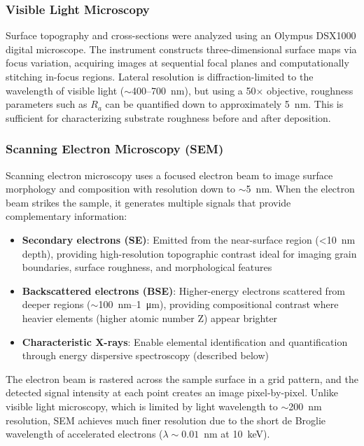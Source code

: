   \subsubsection{Visible Light Microscopy}
    
    Surface topography and cross-sections were analyzed using an Olympus DSX1000 digital microscope. The instrument constructs three-dimensional surface maps via focus variation, acquiring images at sequential focal planes and computationally stitching in-focus regions. Lateral resolution is diffraction-limited to the wavelength of visible light ($\sim$400--700~nm), but using a 50$\times$ objective, roughness parameters such as $R_a$ can be quantified down to approximately 5~nm. This is sufficient for characterizing substrate roughness before and after deposition.

    \subsubsection{Scanning Electron Microscopy (SEM)}
    
    Scanning electron microscopy uses a focused electron beam to image surface morphology and composition with resolution down to $\sim$5~nm. When the electron beam strikes the sample, it generates multiple signals that provide complementary information:
    
    \begin{itemize}
        \item \textbf{Secondary electrons (SE)}: Emitted from the near-surface region (<10~nm depth), providing high-resolution topographic contrast ideal for imaging grain boundaries, surface roughness, and morphological features
        \item \textbf{Backscattered electrons (BSE)}: Higher-energy electrons scattered from deeper regions ($\sim$100~nm--1~\unit{\um}), providing compositional contrast where heavier elements (higher atomic number Z) appear brighter
        \item \textbf{Characteristic X-rays}: Enable elemental identification and quantification through energy dispersive spectroscopy (described below)
    \end{itemize}
    
    The electron beam is rastered across the sample surface in a grid pattern, and the detected signal intensity at each point creates an image pixel-by-pixel. Unlike visible light microscopy, which is limited by light wavelength to $\sim$200~nm resolution, SEM achieves much finer resolution due to the short de Broglie wavelength of accelerated electrons ($\lambda \sim 0.01$~nm at 10~keV). 
    
